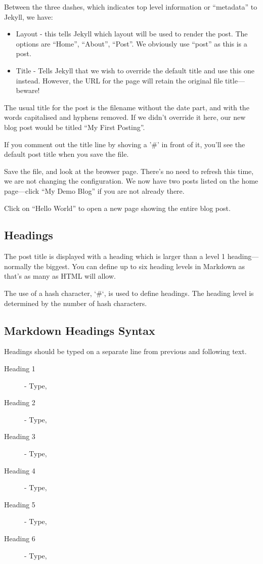 Between the three dashes, which indicates top level information or ``metadata'' to Jekyll, we have:

\begin{itemize}
    \item Layout - this tells Jekyll which layout will be used to render the post. The options are ``Home'', ``About'', ``Post''. We obviously use ``post'' as this is a post.
    \item Title - Tells Jekyll that we wish to override the default title and use this one instead. However, the URL for the page will retain the original file title---beware!
\end{itemize}

The usual title for the post is the filename without the date part, and with the words capitalised and hyphens removed. If we didn't override it here, our new blog post would be titled ``My First Posting''.

If you comment out the title line by shoving a '\#' in front of it, you'll see the default post title when you save the file.

Save the file, and look at the browser page. There's no need to refresh this time, we are not changing the configuration. We now have two posts listed on the home page---click ``My Demo Blog'' if you are not already there.

Click on ``Hello World'' to open a new page showing the entire blog post.

\subsection{Headings}\label{sect: Headings}

The post title is displayed with a heading which is larger than a level 1 heading---normally the biggest. You can define up to six heading levels in Markdown as that's as many as HTML will allow.

The use of a hash character, `\#`, is used to define headings. The heading level is determined by the number of hash characters.

\subsection{Markdown Headings Syntax}\label{sect: Markdown Headings Syntax}

Headings should be typed on a separate line from previous and following text.

\begin{description}
    \item[Heading 1] - Type, 
    \item[Heading 2] - Type, 
    \item[Heading 3] - Type, 
    \item[Heading 4] - Type, 
    \item[Heading 5] - Type, 
    \item[Heading 6] - Type, 
\end{description}


